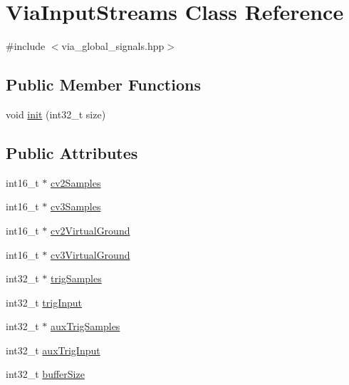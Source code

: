 \hypertarget{class_via_input_streams}{}\section{Via\+Input\+Streams Class Reference}
\label{class_via_input_streams}


{\ttfamily \#include $<$via\+\_\+global\+\_\+signals.\+hpp$>$}

\subsection*{Public Member Functions}
\begin{DoxyCompactItemize}
\item 
void \mbox{\hyperlink{class_via_input_streams_a14f0b85750cc3ff347e8e41a93d7c7e6}{init}} (int32\+\_\+t size)
\end{DoxyCompactItemize}
\subsection*{Public Attributes}
\begin{DoxyCompactItemize}
\item 
int16\+\_\+t $\ast$ \mbox{\hyperlink{class_via_input_streams_aaaad1787b22dcd2f54dfa01f70093fd1}{cv2\+Samples}}
\item 
int16\+\_\+t $\ast$ \mbox{\hyperlink{class_via_input_streams_a6a61e3d96afd2c477b4f265717ff6d9d}{cv3\+Samples}}
\item 
int16\+\_\+t $\ast$ \mbox{\hyperlink{class_via_input_streams_a4278e14d89e1509e1cc57a4782849d3d}{cv2\+Virtual\+Ground}}
\item 
int16\+\_\+t $\ast$ \mbox{\hyperlink{class_via_input_streams_a930c450931d2040df1a731508ebcd3fb}{cv3\+Virtual\+Ground}}
\item 
int32\+\_\+t $\ast$ \mbox{\hyperlink{class_via_input_streams_a294b4ca0fd593286979ab2906e190f58}{trig\+Samples}}
\item 
int32\+\_\+t \mbox{\hyperlink{class_via_input_streams_adaff6bd3eb01189b91be70f79df8f9e3}{trig\+Input}}
\item 
int32\+\_\+t $\ast$ \mbox{\hyperlink{class_via_input_streams_ab89ca6cc2a3a972e19dac682a09f836c}{aux\+Trig\+Samples}}
\item 
int32\+\_\+t \mbox{\hyperlink{class_via_input_streams_a42b631be797819143514e8b2d86e7a84}{aux\+Trig\+Input}}
\item 
int32\+\_\+t \mbox{\hyperlink{class_via_input_streams_a3e400f3c9a77a68c2cd350dcef14e74f}{buffer\+Size}}
\end{DoxyCompactItemize}


